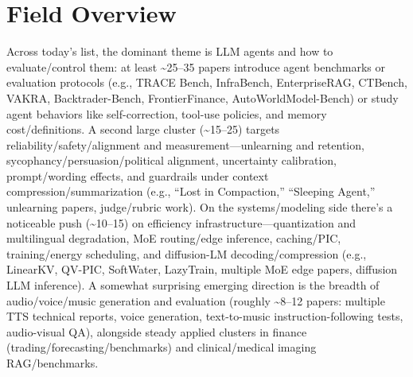 \documentclass[12pt,letterpaper]{article}
\begin{document}
\section*{Field Overview}
{\footnotesize Across today's list, the dominant theme is LLM agents and how to evaluate/control them: at least \textasciitilde{}25--35 papers introduce agent benchmarks or evaluation protocols (e.g., TRACE Bench, InfraBench, EnterpriseRAG, CTBench, VAKRA, Backtrader-Bench, FrontierFinance, AutoWorldModel-Bench) or study agent behaviors like self-correction, tool-use policies, and memory cost/definitions. A second large cluster (\textasciitilde{}15--25) targets reliability/safety/alignment and measurement---unlearning and retention, sycophancy/persuasion/political alignment, uncertainty calibration, prompt/wording effects, and guardrails under context compression/summarization (e.g., ``Lost in Compaction,'' ``Sleeping Agent,'' unlearning papers, judge/rubric work). On the systems/modeling side there's a noticeable push (\textasciitilde{}10--15) on efficiency infrastructure---quantization and multilingual degradation, MoE routing/edge inference, caching/PIC, training/energy scheduling, and diffusion-LM decoding/compression (e.g., LinearKV, QV-PIC, SoftWater, LazyTrain, multiple MoE edge papers, diffusion LLM inference). A somewhat surprising emerging direction is the breadth of audio/voice/music generation and evaluation (roughly \textasciitilde{}8--12 papers: multiple TTS technical reports, voice generation, text-to-music instruction-following tests, audio-visual QA), alongside steady applied clusters in finance (trading/forecasting/benchmarks) and clinical/medical imaging RAG/benchmarks.}
\end{document}
